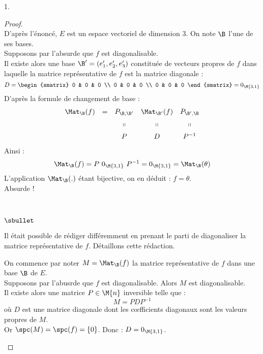 \documentclass[11pt]{article}%
\begin{document}
\begin{noliste}{1.}
  \begin{proof}~\\
    D'après l'énoncé, $E$ est un espace vectoriel de dimension $3$. On
    note $\B$ l'une de ses bases.\\[.2cm]
    Supposons par l'absurde que $f$ est diagonalisable. \\
    Il existe alors une base $\B' = (e_1', e_2', e_3')$ constituée de
    vecteurs propres de $f$ dans laquelle la matrice représentative de
    $f$ est la matrice diagonale :
    \[
    D = 
    \begin{smatrix}
      0 & 0 & 0 \\
      0 & 0 & 0 \\
      0 & 0 & 0
    \end{smatrix} = 0_{\M{3,1}}
    \]
    D'après la formule de changement de base :
    \[
    \begin{array}{ccccc}
      \Mat_{\B}(f) & = & P_{\B, \B'} & \Mat_{\B'}(f) & P_{\B', \B}
      \\[.2cm]
      & & \shortparallel & \shortparallel &
      \shortparallel
      \\[.2cm]
      & & P & D & P^{-1}
    \end{array}
    \]
    Ainsi :
    \[
    \Mat_{\B}(f) = P \ 0_{\M{3,1}} \ P^{-1} = 0_{\M{3,1}} =
    \Mat_{\B}(\theta)
    \]
    L'application $\Mat_{\B}(.)$ étant bijective, on en déduit : $f =
    \theta$.\\
    Absurde ! ~\\[-.6cm]%
    \begin{remark}~
      \begin{noliste}{$\sbullet$}
      \item Il était possible de rédiger différemment en prenant le
        parti de diagonaliser la matrice représentative de
        $f$. Détaillons cette rédaction.
      \item On commence par noter $M = \Mat_{\B}(f)$ la matrice
        représentative de $f$ dans une base $\B$ de $E$.\\
        Supposons par l'abusrde que $f$ est diagonalisable. Alors $M$
        est diagonalisable. \\
        Il existe alors une matrice $P \in \M{n}$ inversible telle que
        :
        \[
        M = P D P^{-1}
        \]
        où $D$ est une matrice diagonale dont les c\oe{}fficients
        diagonaux sont les valeurs propres de $M$. \\
        Or $\spc(M) = \spc(f) = \{0\}$. Donc : $D = 0_{\M{3,1}}$.\\

\end{noliste}
\end{remark}
\end{proof}
\end{noliste}
\end{document}
